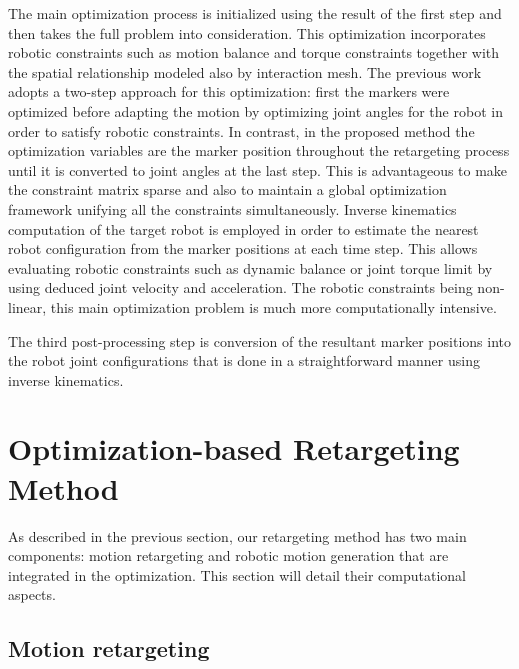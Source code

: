 \documentclass[letterpaper, 10 pt, conference]{ieeeconf}  %
\begin{document}
The main optimization process is initialized using the result of the 
first step and then takes the full problem into consideration. 
This optimization incorporates robotic constraints such as
motion balance and torque constraints together with the spatial
relationship modeled also by interaction mesh.
The previous work \cite{Nakaoka12Humanoids} adopts a two-step approach
for this optimization:
first the markers were optimized before adapting the motion by
optimizing joint angles for the robot in order to satisfy robotic
constraints.  
In contrast, in the proposed method the
optimization variables are the marker position throughout the
retargeting process until it is converted to joint angles at the last
step.
This is advantageous to make the constraint matrix sparse \cite{Komura10}
and also to maintain a global optimization framework
unifying all the constraints simultaneously. 
Inverse  kinematics computation of the target robot is employed in
order to estimate the nearest robot configuration from the marker positions
at each time step. 
This allows evaluating robotic constraints such as dynamic balance or
joint torque limit by using deduced joint velocity and acceleration.
The robotic constraints being non-linear, this main
optimization problem is much more computationally intensive.

The third post-processing step is conversion of the resultant marker
positions into the robot joint configurations that is done in a
straightforward manner using inverse kinematics.  


\section{Optimization-based Retargeting Method}
\label{sec:retargeting}

As described in the previous section, our retargeting method has two
main components: motion retargeting and robotic motion generation that
are integrated in the optimization. This section will detail
their computational aspects.

\subsection{Motion retargeting}
\end{document}
